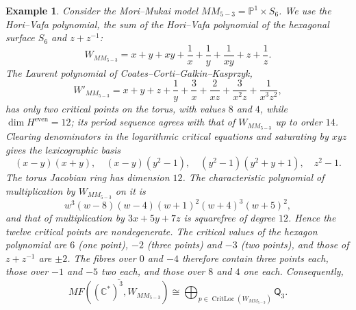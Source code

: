 \documentclass[11pt]{amsart}
\newtheorem{example}{Example}[section]
\DeclareMathOperator{\CritLoc}{CritLoc}
\newcommand{\MorseCat}[1]{\mathsf{Q}_{#1}}
\begin{document}
\begin{example}
Consider the Mori--Mukai model $MM_{5-3}=\mathbb{P}^1\times S_6$.
We use the Hori--Vafa polynomial, the sum of the Hori--Vafa polynomial of
the hexagonal surface $S_6$ and $z+z^{-1}$:
\[
W_{MM_{5-3}}=x+y+xy+\frac{1}{x}+\frac{1}{y}+\frac{1}{xy}+z+\frac{1}{z}.
\]
The Laurent polynomial of Coates--Corti--Galkin--Kasprzyk,
\[
W'_{MM_{5-3}}=x+y+z+\frac{1}{y}+\frac{3}{x}+\frac{2}{xz}+\frac{3}{x^2z}+\frac{1}{x^3z^2},
\]
has only two critical points on the torus, with values $8$ and $4$, while
$\dim H^{\mathrm{even}}=12$; its period sequence agrees with that of
$W_{MM_{5-3}}$ up to order $14$.
Clearing denominators in the logarithmic critical equations and
saturating by $xyz$ gives the lexicographic basis
\[
(x-y)(x+y),\quad
(x-y)(y^2-1),\quad
(y^2-1)(y^2+y+1),\quad
z^2-1.
\]
The torus Jacobian ring has dimension $12$. The characteristic polynomial of
multiplication by $W_{MM_{5-3}}$ on it is
\[
w^3(w-8)(w-4)(w+1)^2(w+4)^3(w+5)^2,
\]
and that of multiplication by $3x+5y+7z$ is squarefree of degree $12$. Hence
the twelve critical points are nondegenerate. The critical values of the
hexagon polynomial are $6$ (one point), $-2$ (three points) and $-3$ (two
points), and those of $z+z^{-1}$ are $\pm2$. The fibres over $0$ and $-4$
therefore contain three points each, those over $-1$ and $-5$ two each, and
those over $8$ and $4$ one each. Consequently,
\[
\overline{MF((\mathbb{C}^*)^3,W_{MM_{5-3}})}
\cong \bigoplus_{p\in\CritLoc(W_{MM_{5-3}})}\MorseCat{3}.
\]
\end{example}
\end{document}
